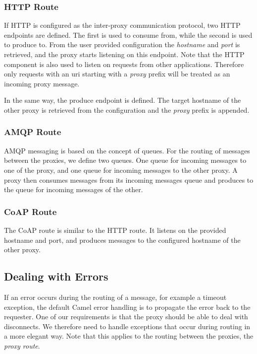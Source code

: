 \subsubsection{HTTP Route}

If HTTP is configured as the inter-proxy communication protocol, two HTTP
endpoints are defined. The first is used to consume from, while the second is
used to produce to. From the user provided configuration the \textit{hostname}
and \textit{port} is retrieved, and the proxy starts listening on this endpoint.
Note that the HTTP component is also used to listen on requests from other
applications. Therefore only requests with an \gls{uri} starting with a
\textit{proxy} prefix will be treated as an incoming proxy message.

In the same way, the produce endpoint is defined. The target hostname of the
other proxy is retrieved from the configuration and the \textit{proxy} prefix
is appended.

\subsubsection{AMQP Route}

AMQP messaging is based on the concept of queues. For the routing of messages
 between the proxies, we define two queues. 
 One queue for incoming messages to one of the proxy, 
 and one queue for incoming messages to the other proxy. 
 A proxy then consumes messages from its incoming messages queue
 and produces to the queue for incoming messages of the other.

\subsubsection{CoAP Route}

The CoAP route is similar to the HTTP route. It listens on the provided hostname
and port, and produces messages to the configured hostname of the other proxy.


\subsection{Dealing with Errors}

If an error occurs during the routing of a message, for example a timeout
exception, the default Camel error handling is to propagate the error back to
the requester. One of our requirements is that the proxy should be able to deal
with disconnects. We therefore need to handle exceptions that occur during
routing in a more elegant way. Note that this applies to the routing between the
proxies, the \textit{proxy route}.

